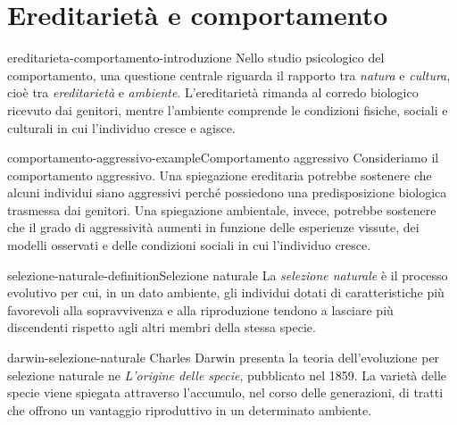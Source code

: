 \documentclass[preview]{standalone}
\begin{document}
\genpage

\section{Ereditarietà e comportamento}

\begin{snippet}{ereditarieta-comportamento-introduzione}
    Nello studio psicologico del comportamento, una questione centrale riguarda
    il rapporto tra \emph{natura} e \emph{cultura}, cioè tra
    \emph{ereditarietà} e \emph{ambiente}. L'ereditarietà rimanda al corredo
    biologico ricevuto dai genitori, mentre l'ambiente comprende le condizioni
    fisiche, sociali e culturali in cui l'individuo cresce e agisce.
\end{snippet}

\begin{snippetexample}{comportamento-aggressivo-example}{Comportamento aggressivo}
    Consideriamo il comportamento aggressivo. Una spiegazione ereditaria
    potrebbe sostenere che alcuni individui siano aggressivi perché possiedono
    una predisposizione biologica trasmessa dai genitori. Una spiegazione
    ambientale, invece, potrebbe sostenere che il grado di aggressività aumenti
    in funzione delle esperienze vissute, dei modelli osservati e delle
    condizioni sociali in cui l'individuo cresce.
\end{snippetexample}

\begin{snippetdefinition}{selezione-naturale-definition}{Selezione naturale}
    La \emph{selezione naturale} è il processo evolutivo per cui, in un dato
    ambiente, gli individui dotati di caratteristiche più favorevoli alla
    sopravvivenza e alla riproduzione tendono a lasciare più discendenti
    rispetto agli altri membri della stessa specie.
\end{snippetdefinition}

\begin{snippet}{darwin-selezione-naturale}
    Charles Darwin presenta la teoria dell'evoluzione per selezione naturale
    ne \emph{L'origine delle specie}, pubblicato nel 1859. La varietà delle
    specie viene spiegata attraverso l'accumulo, nel corso delle generazioni,
    di tratti che offrono un vantaggio riproduttivo in un determinato ambiente.
\end{snippet}

\end{document}
